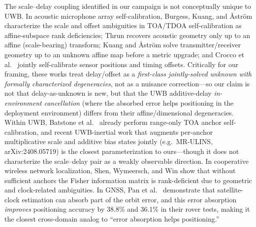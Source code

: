 \documentclass[11pt,a4paper]{article}
\begin{document}
The scale--delay coupling identified in our campaign is not conceptually unique
to UWB. In acoustic microphone array self-calibration, Burgess, Kuang, and
\AA{}str\"om \citep{burgess_2015_toa_self_calibration} characterize the scale and
offset ambiguities in TOA/TDOA self-calibration as affine-subspace rank
deficiencies; Thrun \citep{thrun_2005_affine_structure_from_sound} recovers acoustic
geometry only up to an affine (scale-bearing) transform; Kuang and \AA{}str\"om
\citep{kuang_2013_stratified_tdoa_self_calibration} solve transmitter/receiver
geometry up to an unknown affine map before a metric upgrade; and Crocco et al.\
\citep{crocco_2012_bilinear_self_calibration} jointly self-calibrate sensor positions
and timing offsets. Critically for our framing, these works treat delay/offset as a
\emph{first-class jointly-solved unknown with formally characterized degeneracies},
not as a nuisance correction---so our claim is not that delay-as-unknown is new, but
that the UWB additive-delay \emph{in-environment cancellation} (where the absorbed
error helps positioning in the deployment environment) differs from their
affine/dimensional degeneracies. Within UWB, Batstone et al.\
\citep{batstone_2017_realtime_toa_uwb_self_calibration} already perform range-only TOA
anchor self-calibration, and recent UWB-inertial work that augments per-anchor
multiplicative scale and additive bias states jointly (e.g.\ MR-ULINS,
arXiv:2408.05719) is the closest parameterization to ours---though it does not
characterize the scale--delay pair as a weakly observable direction.
In cooperative wireless network localization, Shen, Wymeersch, and Win
\citep{shen_2010_fundamental_limits_cooperative} show that without sufficient
anchors the Fisher information matrix is rank-deficient due to geometric and
clock-related ambiguities. In GNSS, Pan et al.\
\citep{pan_2015_realtime_ppp_clock_orbit} demonstrate that satellite-clock
estimation can absorb part of the orbit error, and this error absorption
\emph{improves} positioning accuracy by 38.8\% and 36.1\% in their rover tests,
making it the closest cross-domain analog to ``error absorption helps
positioning.''
\end{document}
